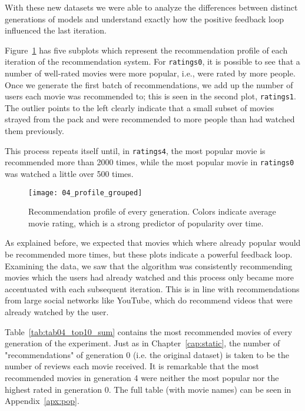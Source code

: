 With these new datasets we were able to analyze the differences between distinct
generations of models and understand exactly how the positive feedback loop
influenced the last iteration.

Figure~\ref{fig:fig04_profile_grouped} has five subplots which represent the
recommendation profile of each iteration of the recommendation system. For
\verb|ratings0|, it is possible to see that a number of well-rated movies were
more popular, i.e., were rated by more people. Once we generate the first batch
of recommendations, we add up the number of users each movie was recommended to;
this is seen in the second plot, \verb|ratings1|. The outlier points to the left
clearly indicate that a small subset of movies strayed from the pack and were
recommended to more people than had watched them previously.

This process repeats itself until, in \verb|ratings4|, the most popular movie is
recommended more than 2000 times, while the most popular movie in
\verb|ratings0| was watched a little over 500 times.

\begin{figure}
  \centering
  \texttt{[image: 04\_profile\_grouped]}
  \caption{Recommendation profile of every generation. Colors indicate average
  movie rating, which is a strong predictor of popularity over time.
  \label{fig:fig04_profile_grouped}}
\end{figure}

As explained before, we expected that movies which where already popular would
be recommended more times, but these plots indicate a powerful feedback loop.
Examining the data, we saw that the algorithm was consistently recommending
movies which the users had already watched and this process only became more
accentuated with each subsequent iteration. This is in line with recommendations
from large social networks like YouTube, which do recommend videos that were
already watched by the user.

Table~\ref{tab:tab04_top10_sum} contains the most recommended movies of every
generation of the experiment. Just as in Chapter~\ref{cap:static}, the number of
"recommendations" of generation 0 (i.e. the original dataset) is taken to be the
number of reviews each movie received. It is remarkable that the most
recommended movies in generation 4 were neither the most popular nor the highest
rated in generation 0. The full table (with movie names) can be seen in
Appendix~\ref{apx:pop}.

